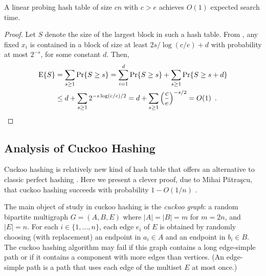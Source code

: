 \documentclass{patmorin}
\begin{document}
\begin{cor}
  A linear probing hash table of size $cn$ with $c > e$ achieves
  $O(1)$ expected search time.
\end{cor}
\begin{proof}
  Let $S$ denote the size of the largest block in such a hash
  table. From , any fixed $x_i$ is contained in
  a block of size at least $2s/\log (c/e) + d$ with probability at most $2^{-s}$, for some constant $d$. Then,
  \begin{align*}
    \operatorname{\mathrm{E}}\{S\} &= \sum_{s \ge 1} \Pr\{S \ge s\} = \sum_{i=1}^d \Pr\{S \ge s\} + \sum_{s \ge 1} \Pr\{S \ge s + d\} \\
            &\le d + \sum_{s \ge 1} 2^{-s \log (c/e)/2} = d + \sum_{s \ge 1} \left(\frac{c}{e}\right)^{-s/2} = O(1) \enspace . \qedhere
  \end{align*}
\end{proof}

\subsection{Analysis of Cuckoo Hashing}

Cuckoo hashing is relatively new kind of hash table that offers an
alternative to classic perfect hashing \cite{pagh.rodler:cuckoo}. Here
we present a clever proof, due to Mihai Pătraşcu, that cuckoo hashing
succeeds with probability $1-O(1/n)$ \cite{patrascu:cuckoo}.

The main object of study in cuckoo hashing is the \emph{cuckoo graph}:
a random bipartite multigraph $G=(A,B,E)$ where $|A|=|B|=m$ for
$m = 2n$, and $|E|=n$.  For each $i\in\{1,\ldots,n\}$, each edge $e_i$
of $E$ is obtained by randomly choosing (with replacement) an endpoint
in $a_i\in A$ and an endpoint in $b_i\in B$.  The cuckoo hashing
algorithm may fail if this graph contains a long edge-simple path or
if it contains a component with more edges than vertices.  (An
edge-simple path is a path that uses each edge of the multiset $E$ at
most once.)
\end{document}
